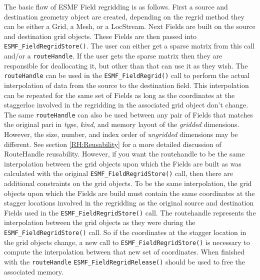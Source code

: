    The basic flow of ESMF Field regridding is as follows. First a source and destination geometry object are created, depending on 
   the regrid method they can be either a Grid, a Mesh, or a LocStream. 
   Next Fields are built on the source and destination grid objects. These Fields are then passed into {\tt ESMF\_FieldRegridStore()}. The user can either get a 
   sparse matrix from this call and/or a {\tt routeHandle}. If the user gets the sparse matrix then they are responsible for deallocating it, but other than that
   can use it as they wish. The {\tt routeHandle} can be used in the {\tt ESMF\_FieldRegrid()} call to perform the actual interpolation of data from the source 
   to the destination field. This interpolation can be repeated for the same set of Fields as long as the coordinates at the staggerloc involved in the
   regridding in the associated grid object don't change. The same {\tt routeHandle} can also be used between any pair of Fields that matches the original 
   pari in {\em type}, {\em kind}, and memory layout of the {\em gridded} dimensions. However, the size, number, and index order of {\em ungridded} dimensions
   may be different. See section \ref{RH:Reusability} for a more detailed discussion of RouteHandle reusability.
   However, if you want                                     
   the routehandle to be the same interpolation between the grid objects upon which the Fields are built as was calculated                                        
   with the original {\tt ESMF\_FieldRegridStore()} call, then there                                                                                              
   are additional constraints on the grid objects. To be the same interpolation, the grid objects upon which the                                                  
   Fields are build must contain the same coordinates at the stagger locations involved in the regridding as                                                      
   the original source and destination Fields used in the {\tt ESMF\_FieldRegridStore()} call.                                                                    
   The routehandle represents the interpolation between the grid objects as they were during the {\tt ESMF\_FieldRegridStore()} call.                             
   So if the coordinates at the stagger location in the grid objects change, a new call to {\tt ESMF\_FieldRegridStore()}                                         
   is necessary to compute the interpolation between that new set of coordinates. When finished with the {\tt routeHandle} 
   {\tt ESMF\_FieldRegridRelease()} should be used to 
   free the associated memory. 
  
